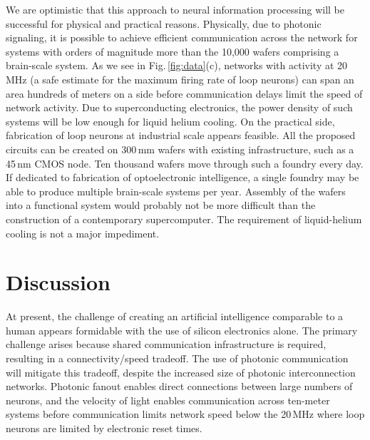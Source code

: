 \documentclass[twocolumn]{article}
\begin{document}
We are optimistic that this approach to neural information processing will be successful for physical and practical reasons. Physically, due to photonic signaling, it is possible to achieve efficient communication across the network for systems with orders of magnitude more than the 10,000 wafers comprising a brain-scale system. As we see in Fig.\,\ref{fig:data}(c), networks with activity at 20\,MHz (a safe estimate for the maximum firing rate of loop neurons) can span an area hundreds of meters on a side before communication delays limit the speed of network activity. Due to superconducting electronics, the power density of such systems will be low enough for liquid helium cooling. On the practical side, fabrication of loop neurons at industrial scale appears feasible. All the proposed circuits can be created on 300\,mm wafers with existing infrastructure, such as a 45\,nm CMOS node. Ten thousand wafers move through such a foundry every day. If dedicated to fabrication of optoelectronic intelligence, a single foundry may be able to produce multiple brain-scale systems per year. Assembly of the wafers into a functional system would probably not be more difficult than the construction of a contemporary supercomputer. The requirement of liquid-helium cooling is not a major impediment.

\section{\label{sec:discussion}Discussion}
At present, the challenge of creating an artificial intelligence comparable to a human appears formidable with the use of silicon electronics alone. The primary challenge arises because shared communication infrastructure is required, resulting in a connectivity/speed tradeoff. The use of photonic communication will mitigate this tradeoff, despite the increased size of photonic interconnection networks. Photonic fanout enables direct connections between large numbers of neurons, and the velocity of light enables communication across ten-meter systems before communication limits network speed below the 20\,MHz where loop neurons are limited by electronic reset times. 
\end{document}
